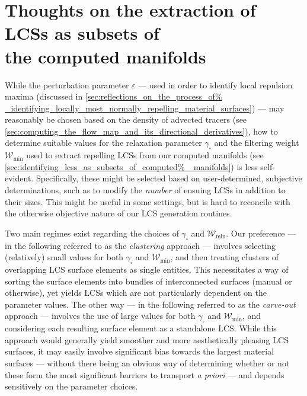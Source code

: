 \section[Thoughts on the extraction of LCSs as subsets of the computed manifolds]
{Thoughts on the extraction of LCSs as subsets of \\\phantom{5.5}
 the computed manifolds}
\label{sec:thoughts_on_the_extraction_of_lcss_as_subsets_of_the_computed%
_manifolds}

While the perturbation parameter $\varepsilon$ --- used in order to identify
local repulsion maxima (discussed in \cref{sec:reflections_on_the_process_of%
_identifying_locally_most_normally_repelling_material_surfaces}) --- may
reasonably be chosen based on the density of advected tracers (see
\cref{sec:computing_the_flow_map_and_its_directional_derivatives}), how to
determine suitable values for the relaxation parameter $\gamma_{\square}$ and
the filtering weight $\mathcal{W}_{\min}$ used to extract repelling LCSs from
our computed manifolds (see \cref{sec:identifying_lcss_as_subsets_of_computed%
_manifolds}) is less self-evident. Specifically, these might be selected based
on user-determined, subjective determinations, such as to modify the
\emph{number} of ensuing LCSs in addition to their sizes. This might be useful
in some settings, but is hard to reconcile with the otherwise objective nature
of our LCS generation routines.

Two main regimes exist regarding the choices of $\gamma_{\square}$ and
$\mathcal{W}_{\min}$. Our preference --- in the following referred to as the
\emph{clustering} approach --- involves selecting (relatively) small values for
both $\gamma_{\square}$ and $\mathcal{W}_{\min}$, and then treating clusters of
overlapping LCS surface elements as single entities. This necessitates a way of
sorting the surface elements into bundles of interconnected surfaces (manual or
otherwise), yet yields LCSs which are not particularly dependent on the
parameter values. The other way --- in the following referred to as the
\emph{carve-out} approach --- involves the use of large values for both
$\gamma_{\square}$ and $\mathcal{W}_{\min}$, and considering each resulting
surface element as a standalone LCS. While this approach would generally yield
smoother and more aesthetically pleasing LCS surfaces, it may easily involve
significant bias towards the largest material surfaces --- without there being
an obvious way of determining whether or not these form the most significant
barriers to transport \emph{a priori} --- and depends sensitively on the
parameter choices.

